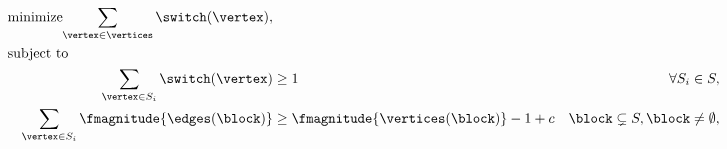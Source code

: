 \begin{align}
    & \underset{}{\text{minimize}}\hspace{-2cm} 
    & \sum_{\vertex\in\vertices} \switch(\vertex),&
    \label{ch:facts:lp:pumpkin-hitting-set:eq:objective}
\\
    & \text{subject to}\hspace{-3cm}& &
    \nonumber
\\%
    & & \sum_{\vertex\in S_i} \switch(\vertex) &\geq 1
    & \forall S_i\in S,
    \label{ch:facts:lp:pumpkin-hitting-set:eq:hitting-set-constraint}
\\
    & & \sum_{\vertex\in S_i} \fmagnitude{\edges(\block)} &\geq 
    \fmagnitude{\vertices(\block)}-1+c
    & \block\subsetneq S, \block\neq\emptyset,
    \label{ch:facts:lp:pumpkin-hitting-set:eq:subtour-exclusion}
\end{align}